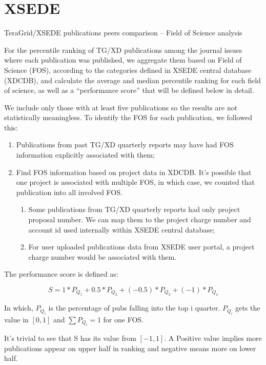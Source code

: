 \documentclass{sig-alternate}
\begin{document}
\section{XSEDE}

TeraGrid/XSEDE publications peers comparison – Field of Science analysis


For the percentile ranking of TG/XD publications among the journal issues where each publication was published, we aggregate them based on Field of Science (FOS), according to the categories defined in XSEDE central database (XDCDB), and calculate the average and median percentile ranking for each field of science, as well as a ``performance score'' that will be defined below in detail.

We include only those with at least five publications so the results
are not statistically meaningless. To identify the FOS for each
publication, we followed this:

\begin{enumerate}

\item	Publications from past TG/XD quarterly reports may have had FOS information explicitly associated with them;
\item	Find FOS information based on project data in XDCDB. It's
  possible that one project is associated with multiple FOS, in which
  case, we counted that publication into all involved FOS.
\begin{enumerate}
\item	Some publications from TG/XD quarterly reports had only project proposal number. We can map them to the project charge number and account id used internally within XSEDE central database;
\item	For user uploaded publications data from XSEDE user portal, a project charge number would be associated with them.
\end{enumerate}
\end{enumerate}

The performance score is defined as:

\[	S = 1*P_{Q_1} + 0.5*P_{Q_2}+ (-0.5)*P_{Q_3} + (-1)*P_{Q_4} \]

In which, $P_{Q_i}$ is the percentage of pubs falling into the top i
quarter. $P_{Q_i}$ gets the value in $[0,1]$ and $\sum {P_{Q_i}} = 1$ for one FOS.

It's trivial to see that S has its value from $[-1, 1]$. A Positive value implies more publications appear on upper half in ranking and negative means more on lower half.
\end{document}
